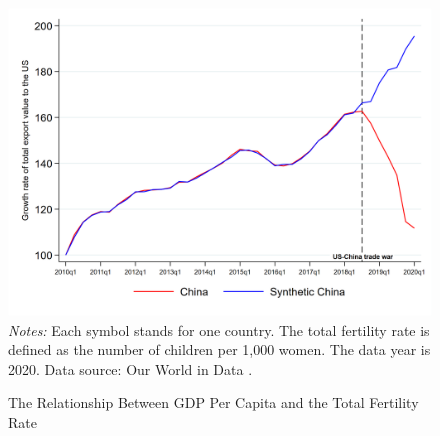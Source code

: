 \documentclass[12pt]{article}
\begin{document}
\newpage
\begin{figure}[H]
	\centering
	\caption{The Relationship Between GDP Per Capita and the Total Fertility Rate}\label{fig.gdp_fertility}
	\includegraphics[width=0.8\linewidth]{figures/SCM_us_ch.png}\\
	\fontsize{10}{10pt}\selectfont
	\flushleft
	\emph{Notes:} Each symbol stands for one country. The total fertility rate is defined as the number of children per 1,000 women. The data year is 2020. Data source: Our World in Data \citep{owidfertilityrate,owidgdp}.
\end{figure}
\end{document}

